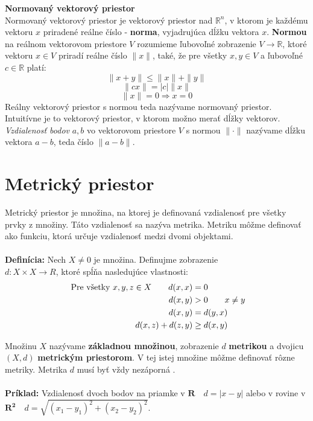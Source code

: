 \documentclass[12pt,a4paper,oneside]{fithesis2}
\begin{document}
\textbf{Normovaný vektorový priestor}\\
Normovaný vektorový priestor je vektorový priestor nad $\mathbb{R}^n$, v ktorom je každému vektoru $x$ priradené reálne číslo - \textbf{norma}, vyjadrujúca dĺžku vektora $x$. \textbf{Normou} na reálnom vektorovom priestore $V$ rozumieme ľubovoľné zobrazenie $V \rightarrow \mathbb{R}$, ktoré vektoru $x \in V$ priradí reálne číslo $\| x \|$, také, že pre všetky $x,y \in V$ a ľubovoľné $c \in \mathbb{R}$ platí:
\begin{equation*}
\| x + y \| \leq \|x\| + \|y\|
\end{equation*}
\begin{equation*}
\| cx \| = |c| \| x \|
\end{equation*}
\begin{equation*}
\|x\| = 0  \Rightarrow x = 0
\end{equation*}
Reálny vektorový priestor s normou teda nazývame normovaný priestor. Intuitívne je to vektorový priestor, v ktorom možno merať dĺžky vektorov. \textit{Vzdialenosť bodov} $a, b$ vo vektorovom priestore $V$ s normou $\| \cdot \|$ nazývame dĺžku vektora $a - b$, teda číslo $\|a-b\|$.

\section{Metrický priestor}
    
    Metrický priestor je množina, na ktorej je definovaná vzdialenosť pre všetky prvky z množiny. Táto vzdialenosť sa nazýva metrika. Metriku môžme definovať ako funkciu, ktorá určuje vzdialenosť medzi dvomi objektami. \\ \\
    \textbf{Definícia:} Nech $X\neq 0$ je množina. Definujme zobrazenie \\ $d: X \times X \rightarrow R $, ktoré spĺňa nasledujúce vlastnosti:
    \begin{align*}
    \textrm{ Pre všetky } x,y,z \in X \qquad d(x,x) &= 0 \\
    d(x,y) &\textgreater 0 \qquad x\neq y \\
    d(x,y) &= d(y,x) \\
    d(x,z) + d(z,y) &\geq d(x,y)
    \end{align*}
    
    Množinu \textbf{$X$} nazývame \textbf{základnou množinou}, zobrazenie $d$ \textbf{metrikou} a  dvojicu $(X,d)$ \textbf{metrickým priestorom}.
    V tej istej množine môžme definovať rôzne metriky. Metrika $d$ musí byť vždy nezáporná \cite{Yianilos:1993:DSA:313559.313789}. \\ \\
    \textbf{Príklad:} 
    Vzdialenosť dvoch bodov na priamke v $ \mathbf{R} \quad d=|x-y| $ alebo v rovine v
     $\mathbf{R^2} \quad d = \sqrt{(x_1-y_1)^2+(x_2-y_2)^2}$.
    
\end{document}
